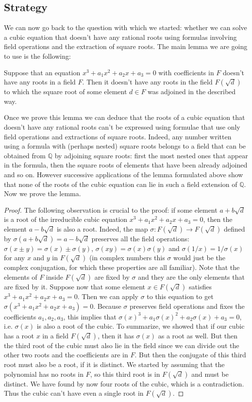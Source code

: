 \subsection{Strategy}
We can now go back to the question with which we started: whether we can solve a cubic equation that doesn't have any rational roots using formulas involving field operations and the extraction of square roots.
The main lemma we are going to use is the following:
\begin{lemma}
Suppose that an equation $x^3+a_1 x^2+a_2 x+a_3=0$ with coefficients in $F$ doesn't have any roots in a field $F$. Then it doesn't have any roots in the field $F(\sqrt{d})$ to which the square root of some element $d\in F$ was adjoined in the described way.
\end{lemma}
Once we prove this lemma we can deduce that the roots of a cubic equation that doesn't have any rational roots can't be expressed using formulae that use only field operations and extractions of square roots. Indeed, any number written using a formula with (perhaps nested) square roots belongs to a field that can be obtained from $\mathbb{Q}$ by adjoining square roots: first the most nested ones that appear in the formula, then the square roots of elements that have been already adjoined and so on. However successive applications of the lemma formulated above show that none of the roots of the cubic equation can lie in such a field extension of $\mathbb{Q}$.
Now we prove the lemma.
\begin{proof}
The following observation is crucial to the proof: if some element $a+b\sqrt{d}$ is a root of the irreducible cubic equation $x^3+a_1 x^2+a_2 x+a_3=0$, then the element $a-b\sqrt{d}$ is also a root. Indeed, the map $\sigma:F(\sqrt{d})\rightarrow F(\sqrt{d})$ defined by $\sigma(a+b\sqrt{d})=a-b\sqrt{d}$ preserves all the field operations: $\sigma(x\pm y)=\sigma(x)\pm\sigma(y)$, $\sigma(xy)=\sigma(x)\sigma(y)$ and $\sigma(1/x)=1/\sigma(x)$ for any $x$ and $y$ in $F(\sqrt{d})$ (in complex numbers this $\sigma$ would just be the complex conjugation, for which these properties are all familiar). Note that the elements of $F$ inside $F(\sqrt{d})$ are fixed by $\sigma$ and they are the only elements that are fixed by it.
Suppose now that some element $x\in F(\sqrt{d})$ satisfies $x^3+a_1 x^2+a_2 x+a_3=0$. Then we can apply $\sigma$ to this equation to get $\sigma(x^3+a_1 x^2+a_2 x+a_3)=0$. Because $\sigma$ preserves field operations and fixes the coefficients $a_1,a_2,a_3$, this implies that $\sigma(x)^3+a_1 \sigma(x)^2+a_2 \sigma(x)+a_3=0$, i.e. $\sigma(x)$ is also a root of the cubic.
To summarize, we showed that if our cubic has a root $x$ in a field $F(\sqrt{d})$, then it has $\sigma(x)$ as a root as well. But then the third root of the cubic must also lie in the field since we can divide out the other two roots and the coefficients are in $F$. But then the conjugate of this third root must also be a root, if it is distinct. We started by assuming that the polynomial has no roots in $F$, so this third root is in $F(\sqrt{d})$ and must be distinct. We have found by now four roots of the cubic, which is a contradiction. Thus the cubic can't have even a single root in $F(\sqrt{d})$.
\end{proof}
